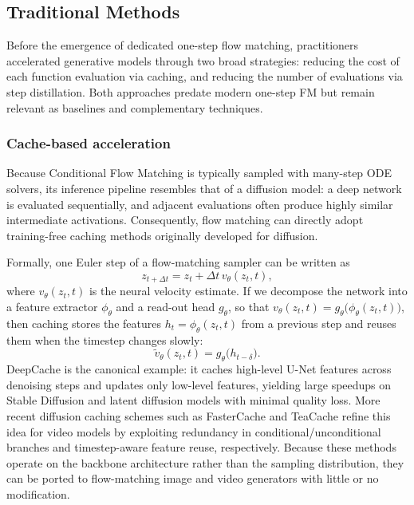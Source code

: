 \subsection{Traditional Methods}
\label{subsec:traditional}

Before the emergence of dedicated one-step flow matching, practitioners accelerated generative models through two broad strategies: reducing the cost of each function evaluation via caching, and reducing the number of evaluations via step distillation. Both approaches predate modern one-step FM but remain relevant as baselines and complementary techniques.

\subsubsection{Cache-based acceleration}

Because Conditional Flow Matching is typically sampled with many-step ODE solvers, its inference pipeline resembles that of a diffusion model: a deep network is evaluated sequentially, and adjacent evaluations often produce highly similar intermediate activations. Consequently, flow matching can directly adopt training-free caching methods originally developed for diffusion.

Formally, one Euler step of a flow-matching sampler can be written as
\begin{equation}
    z_{t+\Delta t} = z_t + \Delta t \, v_\theta(z_t, t),
    \label{eq:euler-step}
\end{equation}
where $v_\theta(z_t, t)$ is the neural velocity estimate. If we decompose the network into a feature extractor $\phi_\theta$ and a read-out head $g_\theta$, so that $v_\theta(z_t, t) = g_\theta\big(\phi_\theta(z_t, t)\big)$, then caching stores the features $h_t = \phi_\theta(z_t, t)$ from a previous step and reuses them when the timestep changes slowly:
\begin{equation}
    \tilde{v}_\theta(z_t, t) = g_\theta\big(h_{t-\delta}\big).
\end{equation}
DeepCache \citep{ma2023deepcache} is the canonical example: it caches high-level U-Net features across denoising steps and updates only low-level features, yielding large speedups on Stable Diffusion and latent diffusion models with minimal quality loss. More recent diffusion caching schemes such as FasterCache \citep{lv2024fastercache} and TeaCache \citep{liu2024teacache} refine this idea for video models by exploiting redundancy in conditional/unconditional branches and timestep-aware feature reuse, respectively. Because these methods operate on the backbone architecture rather than the sampling distribution, they can be ported to flow-matching image and video generators with little or no modification.

